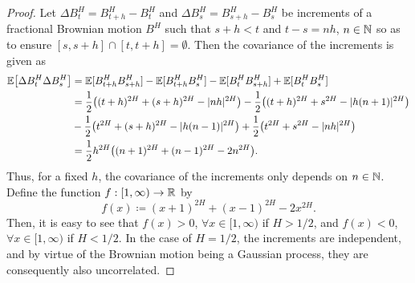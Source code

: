 \begin{proof}
Let $\Delta B_{t}^{H}=B_{t+h}^{H}-B_{t}^{H}$ and $\Delta B_{s}^{H}=B_{s+h}^{H}-B_{s}^{H}$ be increments of a fractional Brownian motion $B^{H}$ such that $s+h< t$ and $t-s=nh$, $n\in \mathbb{N}$ so as to ensure $[s,s+h]\cap [t,t+h]=\emptyset$. Then the covariance of the increments is given as
\begin{align*}
    \E\left[\Delta B_{t}^{H}\Delta B_{s}^{H}\right]&=\E[B_{t+h}^{H}B_{s+h}^{H}]-\E[B_{t+h}^{H}B_{s}^{H}]-\E[B_{t}^{H}B_{s+h}^{H}]+\E[B_{t}^{H}B_{s}^{H}]\\
    &= \frac{1}{2}\left((t+h)^{2H}+(s+h)^{2H}-|nh|^{2H}\right)-\frac{1}{2}\left((t+h)^{2H}+s^{2H}-|h(n+1)|^{2H}\right)\\
    & -\frac{1}{2}\left(t^{2H}+(s+h)^{2H}-|h(n-1)|^{2H}\right)+ \frac{1}{2}\left(t^{2H}+s^{2H}-|nh|^{2H}\right)\\
    &=  \frac{1}{2}h^{2H}\left((n+1)^{2H}+(n-1)^{2H}-2n^{2H}\right).
\end{align*}
Thus, for a fixed $h$, the covariance of the increments only depends on $n\in \mathbb{N}$. Define the function $f:[1,\infty)\to \mathbb{R}$ by
\begin{equation}
f(x)\coloneqq (x+1)^{2H}+(x-1)^{2H}-2x^{2H}.
\end{equation}
Then, it is easy to see that $f(x)>0$, $\forall x\in [1,\infty)$ if $H>1/2$, and $f(x)<0$, $\forall x\in [1,\infty)$ if $H<1/2$. In the case of $H=1/2$, the increments are independent, and by virtue of the Brownian motion being a Gaussian process, they are consequently also uncorrelated.
\end{proof}
